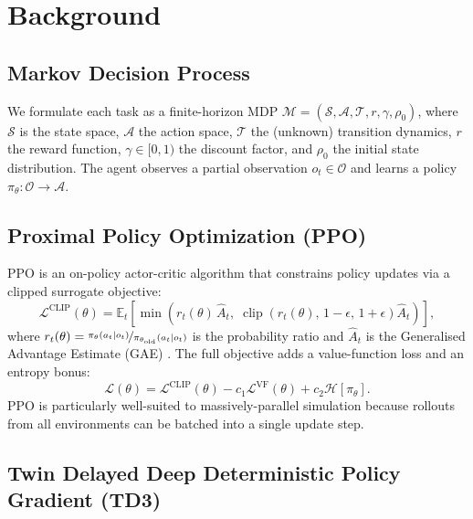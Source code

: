 \documentclass{article}
\begin{document}
\section{Background}

\subsection{Markov Decision Process}

We formulate each task as a finite-horizon MDP
$\mathcal{M} = (\mathcal{S}, \mathcal{A}, \mathcal{T}, r, \gamma, \rho_0)$,
where $\mathcal{S}$ is the state space, $\mathcal{A}$ the action space,
$\mathcal{T}$ the (unknown) transition dynamics, $r$ the reward function,
$\gamma \in [0,1)$ the discount factor, and $\rho_0$ the initial state
distribution.
The agent observes a partial observation $o_t \in \mathcal{O}$ and learns a
policy $\pi_\theta : \mathcal{O} \to \mathcal{A}$.

\subsection{Proximal Policy Optimization (PPO)}

PPO \cite{schulman2017proximal} is an on-policy actor-critic algorithm that
constrains policy updates via a clipped surrogate objective:
\begin{equation}
  \mathcal{L}^{\text{CLIP}}(\theta)
  = \mathbb{E}_t\!\left[
      \min\!\left(
        r_t(\theta)\,\hat{A}_t,\;
        \operatorname{clip}\!\left(r_t(\theta),\,1-\epsilon,\,1+\epsilon\right)\hat{A}_t
      \right)
    \right],
\end{equation}
where $r_t(\theta) = \nicefrac{\pi_\theta(a_t|o_t)}{\pi_{\theta_{\text{old}}}(a_t|o_t)}$
is the probability ratio and $\hat{A}_t$ is the Generalised Advantage
Estimate (GAE) \cite{schulman2015high}.
The full objective adds a value-function loss and an entropy bonus:
\begin{equation}
  \mathcal{L}(\theta)
  = \mathcal{L}^{\text{CLIP}}(\theta)
    - c_1 \mathcal{L}^{\text{VF}}(\theta)
    + c_2 \mathcal{H}[\pi_\theta].
\end{equation}
PPO is particularly well-suited to massively-parallel simulation because
rollouts from all environments can be batched into a single update step.

\subsection{Twin Delayed Deep Deterministic Policy Gradient (TD3)}
\end{document}
